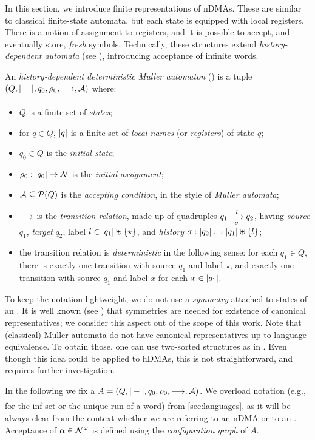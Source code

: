 
In this section, we introduce finite representations of nDMAs. These are similar to classical finite-state automata, but each state is equipped with local registers. There is a notion of assignment to registers, and it is possible to accept, and eventually store, \emph{fresh} symbols. Technically, these structures extend \emph{history-dependent automata} (see \cite{TODO}), introducing acceptance of infinite words.

\begin{definition}\label{def:hdma}
 An \emph{history-dependent deterministic Muller automaton} (\hdma) is a tuple $(Q,|-|,q_0,\rho_0,\overset{}{\underset{}{\longrightarrow}},\mathcal{A})$
 where:
 \begin{itemize}
  \item $Q$ is a finite set of \emph{states};
  \item for $q \in Q$, $|q|$ is a finite set of \emph{local names} (or \emph{registers}) of state $q$;
  \item $q_0 \in Q$ is the \emph{initial state};
  \item $\rho_0 : |q_0| \to \mathcal{N}$ is the \emph{initial assignment};
  \item $\mathcal{A} \subseteq \mathcal{P}(Q)$ is the \emph{accepting condition}, in the style of \emph{Muller automata};
  \item $\overset{}{\underset{}{\longrightarrow}}$ is the \emph{transition relation}, made up of quadruples $q_1 \overset{l}{\underset{\sigma}{\longrightarrow}} q_2$, having \emph{source} $q_1$, \emph{target} $q_2$, label $l \in |q_1| \uplus \{\star\}$, and \emph{history} $\sigma : |q_2| \rightarrowtail |q_1| \uplus \{l\}$;
  \item the transition relation is \emph{deterministic} in the following sense: for each $q_1 \in Q$,   there is exactly one transition with source $q_1$ and label $\star$, and exactly one transition with source $q_1$ and label $x$ for each $x \in |q_1|$.
 \end{itemize}
\end{definition}
%

\begin{remark}
To keep the notation lightweight, we do not use a \emph{symmetry} attached to states of an \hdma. It is well known (see \cite{PistoreThesis?}) that symmetries are needed for existence of canonical representatives; we consider this aspect out of the scope of this work. Note that (classical) Muller automata do not have canonical representatives up-to language equivalence. To obtain those, one can use two-sorted structures as in \cite{CV12}. Even though this idea could be applied to hDMAs, this is not straightforward, and requires further investigation.
\label{rem:no-symmetry}
\end{remark}
%
In the following we fix a \hdma{} $A = (Q,|-|,q_0,\rho_0,\overset{}{\underset{}{\longrightarrow}},\mathcal{A})$. We overload notation (e.g., for the inf-set or the unique run of a word) from \cref{sec:languages}, as it will be always clear from the context whether we are referring to an nDMA or to an \hdma. Acceptance of $\alpha \in \mathcal{N}^\omega$ is defined using the \emph{configuration graph} of $A$.

